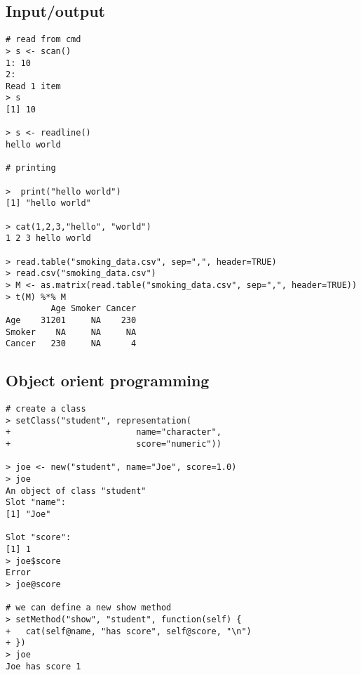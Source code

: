 \documentclass{article}[11pt]
\begin{document}
\subsection*{Input/output}

\begin{verbatim}
# read from cmd
> s <- scan()
1: 10
2: 
Read 1 item
> s
[1] 10

> s <- readline()
hello world

# printing

>  print("hello world")
[1] "hello world"

> cat(1,2,3,"hello", "world")
1 2 3 hello world

> read.table("smoking_data.csv", sep=",", header=TRUE)
> read.csv("smoking_data.csv")
> M <- as.matrix(read.table("smoking_data.csv", sep=",", header=TRUE))
> t(M) %*% M
         Age Smoker Cancer
Age    31201     NA    230
Smoker    NA     NA     NA
Cancer   230     NA      4
\end{verbatim}

\subsection*{Object orient programming}


\begin{verbatim}
# create a class
> setClass("student", representation(
+                         name="character", 
+                         score="numeric"))

> joe <- new("student", name="Joe", score=1.0)
> joe
An object of class "student"
Slot "name":
[1] "Joe"

Slot "score":
[1] 1
> joe$score 
Error
> joe@score

# we can define a new show method
> setMethod("show", "student", function(self) {
+   cat(self@name, "has score", self@score, "\n")
+ })
> joe
Joe has score 1
\end{verbatim}
\end{document}
